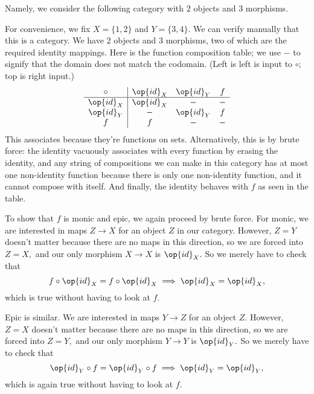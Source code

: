 Namely, we consider the following category with $2$ objects and $3$ morphisms.
\begin{center}
\end{center}
For convenience, we fix $X=\{1,2\}$ and $Y=\{3,4\}.$ We can verify manually that this is a category. We have $2$ objects and $3$ morphisms, two of which are the required identity mappings. Here is the function composition table; we use $-$ to signify that the domain does not match the codomain. (Left is left is input to $\circ$; top is right input.)
\[\begin{array}{c|ccc}
    \circ & \op{id}_X & \op{id}_Y & f \\\hline
    \op{id}_X & \op{id}_X & - & -\\
    \op{id}_Y & - & \op{id}_Y & f\\
    f & f & - & -
\end{array}\]
This associates because they're functions on sets. Alternatively, this is by brute force: the identity vacuously associates with every function by erasing the identity, and any string of compositions we can make in this category has at most one non-identity function because there is only one non-identity function, and it cannot compose with itself. And finally, the identity behaves with $f$ as seen in the table.

To show that $f$ is monic and epic, we again proceed by brute force. For monic, we are interested in maps $Z\to X$ for an object $Z$ in our category. However, $Z=Y$ doesn't matter because there are no maps in this direction, so we are forced into $Z=X,$ and our only morphism $X\to X$ is $\op{id}_X.$ So we merely have to check that
\[f\circ\op{id}_X=f\circ\op{id}_X\implies\op{id}_X=\op{id}_X,\]
which is true without having to look at $f.$

Epic is similar. We are interested in maps $Y\to Z$ for an object $Z.$ However, $Z=X$ doesn't matter because there are no maps in this direction, so we are forced into $Z=Y,$ and our only morphism $Y\to Y$ is $\op{id}_Y.$ So we merely have to check that
\[\op{id}_Y\circ f=\op{id}_Y\circ f\implies\op{id}_Y=\op{id}_Y,\]
which is again true without having to look at $f.$

